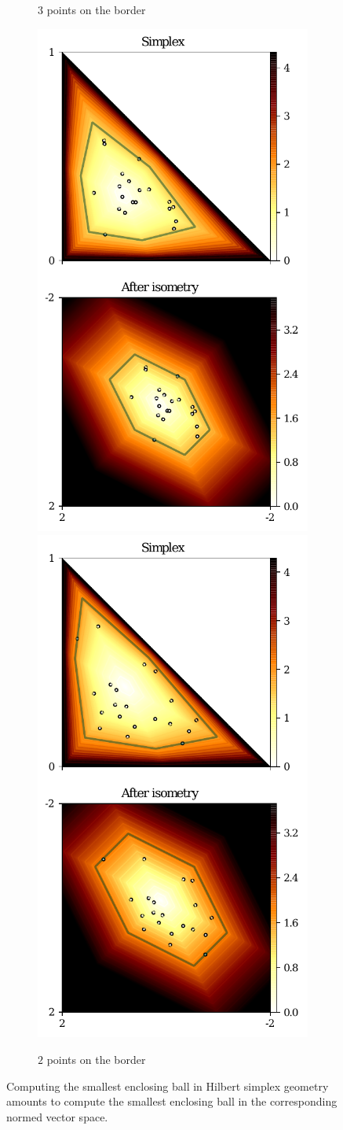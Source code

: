 \documentclass[graybox]{svmult}
\begin{document}
\begin{figure}[t]
\begin{subfigure}[m]{.48\textwidth}
\caption{$3$ points on the border}
\end{subfigure}
\begin{subfigure}[m]{.48\textwidth}
\includegraphics[width=.5\textwidth]{harpe2020.pdf}%
\includegraphics[width=.5\textwidth]{harpe2028.pdf}
\caption{$2$ points on the border}
\end{subfigure}
\caption{Computing the smallest enclosing ball in Hilbert simplex geometry
amounts to compute the smallest enclosing ball in the corresponding normed
vector space.\label{fig:SEB}}
\end{figure}
\end{document}
